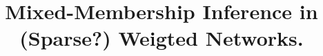 \documentclass[twocolumn]{article}
\title{Mixed-Membership Inference in (Sparse?) Weigted Networks.}
\begin{document}
	
\maketitle
\begin{abstract}
\end{abstract}



\clearpage




\appendix
\end{document}
